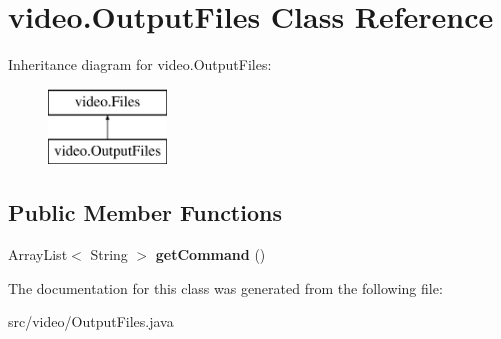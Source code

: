 \hypertarget{classvideo_1_1_output_files}{
\section{video.OutputFiles Class Reference}
\label{classvideo_1_1_output_files}
}
Inheritance diagram for video.OutputFiles:\begin{figure}[H]
\begin{center}
\leavevmode
\includegraphics[height=2.000000cm]{classvideo_1_1_output_files}
\end{center}
\end{figure}
\subsection*{Public Member Functions}
\begin{DoxyCompactItemize}
\item 
\hypertarget{classvideo_1_1_output_files_a5854e1582e2cd8787bd72e4273bb2e53}{
ArrayList$<$ String $>$ {\bfseries getCommand} ()}
\label{classvideo_1_1_output_files_a5854e1582e2cd8787bd72e4273bb2e53}

\end{DoxyCompactItemize}


The documentation for this class was generated from the following file:\begin{DoxyCompactItemize}
\item 
src/video/OutputFiles.java\end{DoxyCompactItemize}
